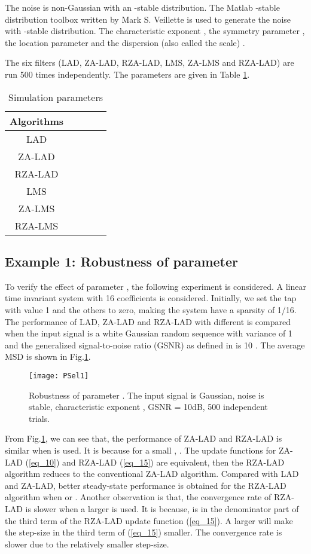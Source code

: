 \documentclass[conference]{IEEEtran}
\begin{document}
The noise is non-Gaussian with an -stable distribution. The Matlab -stable distribution toolbox written by Mark S. Veillette is used to generate the noise with -stable distribution. The characteristic exponent , the symmetry parameter , the location parameter  and the dispersion (also called the scale) . 

The six filters (LAD, ZA-LAD, RZA-LAD, LMS, ZA-LMS and RZA-LAD) are run 500 times independently. The parameters are  given in Table \ref{table1}.
\begin{table}[!h]
\caption{Simulation parameters}
\label{table1}
\centering
\begin{tabular}{ccccc}
\hline
Algorithms &  &  &  \\
\hline
LAD & &  & \\
ZA-LAD &  & & \\
RZA-LAD &&  &\\
LMS & &  & \\
ZA-LMS &  & & \\
RZA-LMS &&  &\\
 \hline
\end{tabular}
\end{table}
\subsection {Example 1: Robustness of parameter }
\label{S4-1}
To verify the effect of parameter , the following experiment is considered.  A linear time invariant system with 16 coefficients is considered. Initially, we set the  tap with value 1 and the others to zero, making the system have a sparsity of 1/16. The performance of LAD, ZA-LAD and RZA-LAD with different    is compared when the input signal is a white Gaussian random sequence with variance
of 1 and the generalized signal-to-noise ratio (GSNR) as defined in \cite{refgsnr} is 10 . The average MSD is shown in Fig.\ref{fig1_r}. 
\begin{figure}[!ht]
\centering
\texttt{[image: PSel1]}
\caption{Robustness of parameter . The input signal is Gaussian, noise is   stable, characteristic exponent  , GSNR = 10dB, 500 independent trials.}
\label{fig1_r}
\end{figure}

From Fig.\ref{fig1_r}, we can see that, the performance of ZA-LAD and RZA-LAD is similar when  is used. It is because for a small , . The update functions for ZA-LAD (\ref{eq_10}) and RZA-LAD  (\ref{eq_15})  are equivalent, then the RZA-LAD algorithm reduces to the conventional ZA-LAD algorithm.
Compared with LAD and ZA-LAD, better steady-state performance is obtained for the RZA-LAD algorithm  when  or . Another observation is that, the  convergence rate of RZA-LAD is slower when a larger  is used. It is because,  is in the denominator part of the third term of the RZA-LAD update function (\ref{eq_15}). A larger  will make the step-size in the third term of (\ref{eq_15}) smaller. The convergence rate is slower due to the relatively smaller step-size. 
\end{document}
